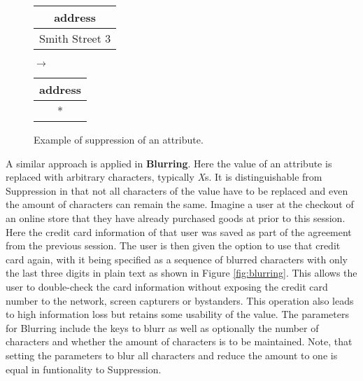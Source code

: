 \begin{figure}[ht]
    \begin{center}
    \footnotesize{
        \renewcommand{\arraystretch}{1.5}
        \begin{tabular}{|c|}
            \hline
            address \\
            \hline
            Smith Street 3 \\
            \hline
            \end{tabular}
            \quad $\longrightarrow$ \quad
            \begin{tabular}{|c|}
            \hline
            address \\
            \hline
            * \\
            \hline
        \end{tabular}
    }
    \end{center}
    \caption{Example of suppression of an attribute.\label{fig:suppression}}
\end{figure}

A similar approach is applied in \textbf{Blurring}. Here the value of an attribute is replaced with arbitrary characters, typically \textit{X}s. It is distinguishable from Suppression in that not all characters of the value have to be replaced and even the amount of characters can remain the same. Imagine a user at the checkout of an online store that they have already purchased goods at prior to this session. Here the credit card information of that user was saved as part of the agreement from the previous session. The user is then given the option to use that credit card again, with it being specified as a sequence of blurred characters with only the last three digits in plain text as shown in Figure \ref{fig:blurring}. This allows the user to double-check the card information without exposing the credit card number to the network, screen capturers or bystanders. This operation also leads to high information loss but retains some usability of the value. The parameters for Blurring include the keys to blurr as well as optionally the number of characters and whether the amount of characters is to be maintained. Note, that setting the parameters to blur all characters and reduce the amount to one is equal in funtionality to Suppression. 

\bigskip

